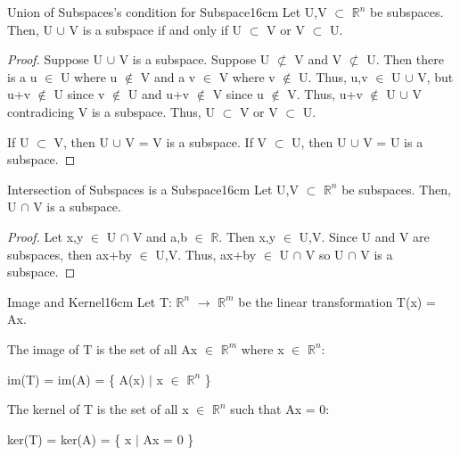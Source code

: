     \vspace{0.5cm}



    \begin{wtheorem}{Union of Subspaces's condition for Subspace}{16cm}
        Let U,V $\subset$ $\mathbb{R}^n$ be subspaces.
        Then, U $\cup$ V is a subspace if and only if
        U $\subset$ V or V $\subset$ U.
    \end{wtheorem}

    \begin{proof}
        Suppose U $\cup$ V is a subspace.
        Suppose U $\not \subset$ V and V $\not \subset$ U.
        Then there is a u $\in$ U where u $\not \in$ V
        and a v $\in$ V where v $\not \in$ U.
        Thus, u,v $\in$ U $\cup$ V, but u+v $\not \in$ U since
        v $\not \in$ U and u+v $\not \in$ V since u $\not \in$ V.
        Thus, u+v $\not \in$ U $\cup$ V contradicing V is a subspace.
        Thus, U $\subset$ V or V $\subset$ U.

        \vspace{0.2cm}

        If U $\subset$ V, then U $\cup$ V = V is a subspace.
        If V $\subset$ U, then U $\cup$ V = U is a subspace. 
    \end{proof}

    \vspace{0.5cm}



    \begin{wtheorem}{Intersection of Subspaces is a Subspace}{16cm}
        Let U,V $\subset$ $\mathbb{R}^n$ be subspaces.
        Then, U $\cap$ V is a subspace.
    \end{wtheorem}

    \begin{proof}
        Let x,y $\in$ U $\cap$ V and a,b $\in$ $\mathbb{R}$.
        Then x,y $\in$ U,V.
        Since U and V are subspaces, then ax+by $\in$ U,V.
        Thus, ax+by $\in$ U $\cap$ V so U $\cap$ V is a subspace.
    \end{proof}

    \vspace{0.5cm}

    \begin{definition}{Image and Kernel}{16cm}
        Let T: $\mathbb{R}^n$ $\rightarrow$ $\mathbb{R}^m$
        be the linear transformation T(x) = Ax.

        The {\color{lblue} image} of T is the set of all Ax $\in$ $\mathbb{R}^m$
        where x $\in$ $\mathbb{R}^n$:

        \hspace{0.5cm}
        im(T) = im(A) = \{ A(x) $|$ x $\in$ $\mathbb{R}^n$ \}

        The {\color{lblue} kernel} of T is the set of all x $\in$ $\mathbb{R}^n$
        such that Ax = 0:

        \hspace{0.5cm}
        ker(T) = ker(A) = \{ x $|$ Ax = 0 \}
    \end{definition}

